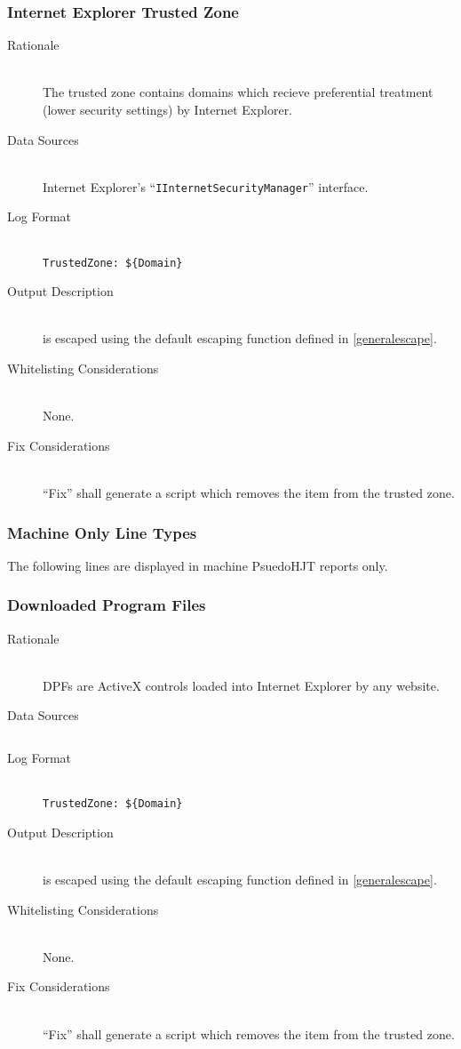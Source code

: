 \subsubsection{Internet Explorer Trusted Zone}
\begin{description}
\item[Rationale] \hfill \\
The trusted zone contains domains which recieve preferential treatment (lower
security settings) by Internet Explorer.
\item[Data Sources] \hfill \\
Internet Explorer's ``\verb|IInternetSecurityManager|'' interface.
\item[Log Format] \hfill \\
\verb|TrustedZone: ${Domain}|
\item[Output Description] \hfill \\
 is escaped using the default escaping function defined in
\ref{generalescape}.
\item[Whitelisting Considerations] \hfill \\
None.
\item[Fix Considerations] \hfill \\
``Fix'' shall generate a script which removes the item from the trusted zone.
\end{description}

\subsubsection{Machine Only Line Types}
The following lines are displayed in machine PsuedoHJT reports only.

\subsubsection{Downloaded Program Files}
\begin{description}
\item[Rationale] \hfill \\
DPFs are ActiveX controls loaded into Internet Explorer by any website.
\item[Data Sources] \hfill
\vspace{-\baselineskip}
\begin{verbatim}

\end{verbatim}
\item[Log Format] \hfill \\
\verb|TrustedZone: ${Domain}|
\item[Output Description] \hfill \\
 is escaped using the default escaping function defined in
\ref{generalescape}.
\item[Whitelisting Considerations] \hfill \\
None.
\item[Fix Considerations] \hfill \\
``Fix'' shall generate a script which removes the item from the trusted zone.
\end{description}

